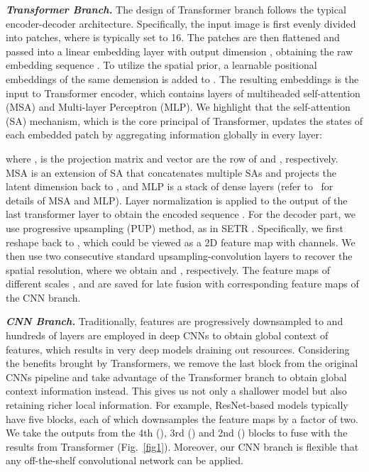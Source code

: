 \documentclass[runningheads]{llncs}
\begin{document}
\textit{\textbf{Transformer Branch.}}
The design of Transformer branch follows the typical encoder-decoder architecture. Specifically, the input image  is first evenly divided into  patches, where  is typically set to 16. The patches are then flattened and passed into a linear embedding layer with output dimension , obtaining the raw embedding sequence . To utilize the spatial prior, a learnable positional embeddings of the same demension is added to . The resulting embeddings  is the input to Transformer encoder, which contains  layers of multiheaded self-attention (MSA) and Multi-layer Perceptron (MLP). We highlight that the self-attention (SA) mechanism, which is the core principal of Transformer, updates the states of each embedded patch by aggregating information globally in every layer:

where ,  is the projection matrix and vector  are the  row of  and , respectively. MSA is an extension of SA that concatenates multiple SAs and projects the latent dimension back to , and MLP is a stack of dense layers (refer to~\cite{dosovitskiy2020image} for details of MSA and MLP). 
Layer normalization is applied to the output of the last transformer layer to obtain the encoded sequence . For the decoder part, we use progressive upsampling (PUP) method, as in  SETR \cite{zheng2020rethinking}. Specifically, we first reshape  back to , which could be viewed as a 2D feature map with  channels. We then use two consecutive standard upsampling-convolution layers to recover the spatial resolution, where we obtain  and , respectively. The feature maps of different scales ,  and  are saved for late fusion with corresponding feature maps of the CNN branch. 

\textit{\textbf{CNN Branch.}}
Traditionally, features are progressively downsampled to  and hundreds of layers are employed in deep CNNs to obtain global context of features, which results in very deep models draining out resources. Considering the benefits brought by Transformers, we remove the last block from the original CNNs pipeline and take advantage of the Transformer branch to obtain global context information instead. This gives us not only a shallower model but also retaining richer local information. For example, ResNet-based models typically have five blocks, each of which downsamples the feature maps by a factor of two. We take the outputs from the 4th (), 3rd () and 2nd () blocks to fuse with the results from Transformer (Fig.~\ref{fig1}).  Moreover, our CNN branch is flexible that any off-the-shelf convolutional network can be applied.  
\end{document}
